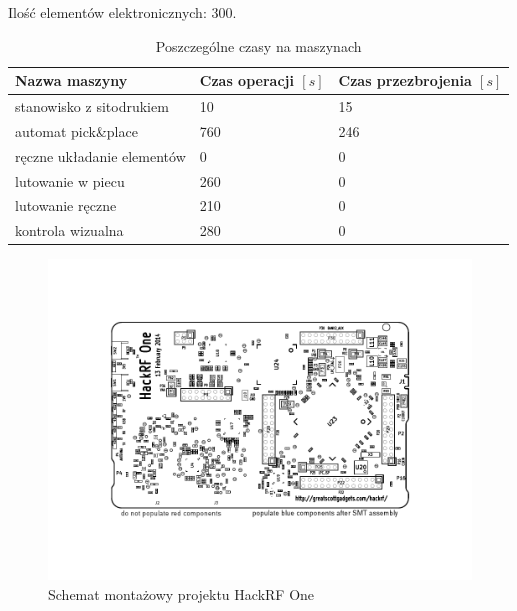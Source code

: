 \breakparagraph{}
Ilość elementów elektronicznych: 300.

\begin{table}[H]
	\centering
	\caption{Poszczególne czasy na maszynach}
	\begin{tabular}{lll}
		\toprule
		Nazwa maszyny                 & Czas operacji $[s]$ & Czas przezbrojenia $[s]$ \\
		\midrule
		stanowisko z sitodrukiem      & 10                  & 15                       \\
		automat pick\&place           & 760                 & 246                      \\
		ręczne układanie elementów & 0                   & 0                        \\
		lutowanie w piecu             & 260                 & 0                        \\
		lutowanie ręczne             & 210                 & 0                        \\
		kontrola wizualna             & 280                 & 0                        \\
		\bottomrule
	\end{tabular}
\end{table}

\begin{figure}[H]
	\centering
	\includegraphics[scale=0.9,clip, trim=1.5cm 2.5cm 1.5cm 2.5cm]{chapters/chapter5/hackrf-one-assembly.pdf}
	\caption{Schemat montażowy projektu HackRF One}
	\label{hackrf}
\end{figure}

